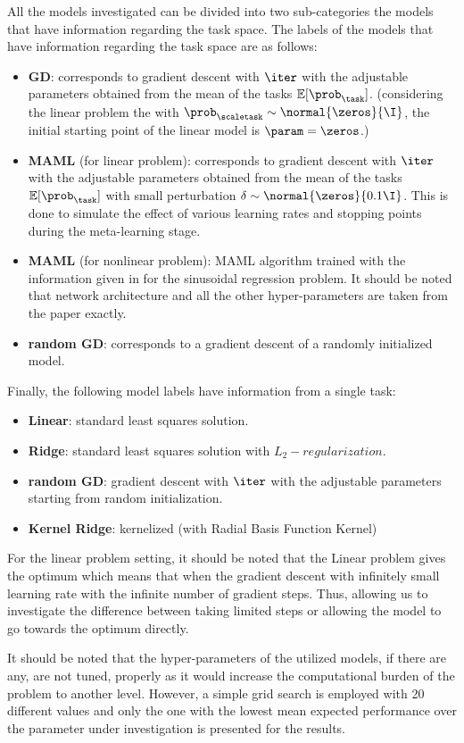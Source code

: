 All the models investigated can be divided into two sub-categories the models that have information regarding the task space. The labels 
of the models that have information regarding the task space are as follows:
\begin{itemize}
  \item \textbf{GD}: corresponds to gradient descent with $\iter$ with the adjustable parameters obtained from the mean of the tasks $\mathbb{E}[\prob_{\task}]$. (\eg considering the linear problem the with $\prob_{\scaletask}\sim\normal{\zeros}{\I}$, the initial starting point of the linear model is $\param=\zeros$.)
  \item \textbf{MAML} (for linear problem): corresponds to gradient descent with $\iter$ with the adjustable parameters obtained from the mean of the tasks $\mathbb{E}[\prob_{\task}]$ with small perturbation $\delta\sim\normal{\zeros}{0.1\I}$. This is done to simulate the effect of various learning rates and stopping points during the meta-learning stage.
  \item \textbf{MAML} (for nonlinear problem): MAML algorithm trained with the information given in \cite{finn2017} for the sinusoidal regression problem. It should be noted that network architecture and all the other hyper-parameters are taken from the paper exactly.
  \item \textbf{random GD}: corresponds to a gradient descent of a randomly initialized model.
\end{itemize} 

Finally, the following model labels have information from a single task:
\begin{itemize}
  \item \textbf{Linear}: standard least squares solution.
  \item \textbf{Ridge}: standard least squares solution with $L_2-regularization$.
  \item \textbf{random GD}: gradient descent with $\iter$ with the adjustable parameters starting from random initialization.
  \item \textbf{Kernel Ridge}: kernelized (with Radial Basis Function Kernel) 
\end{itemize}

For the linear problem setting, it should be noted that the Linear problem gives the optimum which means that when the gradient descent with infinitely small learning rate with the infinite number of gradient steps. Thus, allowing us to investigate the difference between taking limited steps or allowing the model to go towards the optimum directly.

It should be noted that the hyper-parameters of the utilized models, if there are any, are not tuned, properly as it would increase the computational burden of the problem to another level. However, a simple grid search is employed with 20 different values and only the one with the lowest mean expected performance over the parameter under investigation is presented for the results. 




